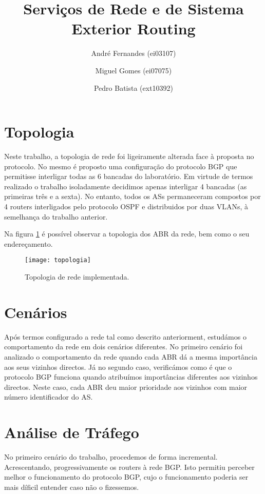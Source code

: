 \documentclass[a4paper,12pt]{article}
\title{Serviços de Rede e de Sistema \\
Exterior Routing }
\author{André Fernandes (ei03107) \and Miguel Gomes (ei07075) \and Pedro Batista (ext10392)}
\begin{document}
\maketitle

\section{Topologia}

Neste trabalho, a topologia de rede foi ligeiramente alterada face à 
proposta no protocolo. No mesmo é proposto uma configuração do protocolo BGP 
que permitisse interligar todas as 6 bancadas do laboratório. 
Em virtude de termos realizado o trabalho isoladamente decidimos apenas 
interligar 4 bancadas (as primeiras três e a sexta).
No entanto, todos os ASs permaneceram compostos por 4 routers interligados pelo 
protocolo OSPF e distribuidos por duas VLANs, à semelhança do trabalho anterior. 

Na figura \ref{fig:topologia} é possível observar a topologia dos ABR da rede,
bem como o seu endereçamento.

\begin{figure}[htp]
	\begin{center}
		\texttt{[image: topologia]}
	\end{center}
	\caption{Topologia de rede implementada.}
	\label{fig:topologia}
\end{figure}

\section{Cenários}

Após termos configurado a rede tal como descrito anteriorment, estudámos o comportamento 
da rede em dois cenários diferentes. No primeiro cenário foi analizado o comportamento 
da rede quando cada ABR dá a mesma importância aos seus vizinhos directos.
Já no segundo caso, verificámos como é que o protocolo BGP funciona quando atribuímos
importâncias diferentes aos vizinhos directos. Neste caso, cada ABR deu maior
prioridade aos vizinhos com maior número identificador do AS.

\section{Análise de Tráfego}

No primeiro cenário do trabalho, procedemos de forma incremental. Acrescentando,
progressivamente os routers à rede BGP. Isto permitiu perceber melhor o
funcionamento do protocolo BGP, cujo o funcionamento poderia ser mais díficil 
entender caso não o fizessemos.
\end{document}
